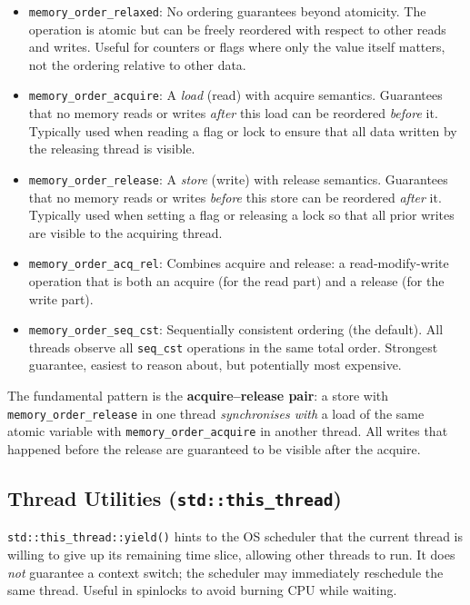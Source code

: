 \documentclass{article}
\begin{document}
\begin{itemize}
    \item \texttt{memory\_order\_relaxed}: No ordering guarantees beyond atomicity. The operation is atomic but can be freely reordered with respect to other reads and writes. Useful for counters or flags where only the value itself matters, not the ordering relative to other data.
    \item \texttt{memory\_order\_acquire}: A \emph{load} (read) with acquire semantics. Guarantees that no memory reads or writes \emph{after} this load can be reordered \emph{before} it. Typically used when reading a flag or lock to ensure that all data written by the releasing thread is visible.
    \item \texttt{memory\_order\_release}: A \emph{store} (write) with release semantics. Guarantees that no memory reads or writes \emph{before} this store can be reordered \emph{after} it. Typically used when setting a flag or releasing a lock so that all prior writes are visible to the acquiring thread.
    \item \texttt{memory\_order\_acq\_rel}: Combines acquire and release: a read-modify-write operation that is both an acquire (for the read part) and a release (for the write part).
    \item \texttt{memory\_order\_seq\_cst}: Sequentially consistent ordering (the default). All threads observe all \texttt{seq\_cst} operations in the same total order. Strongest guarantee, easiest to reason about, but potentially most expensive.
\end{itemize}

The fundamental pattern is the \textbf{acquire--release pair}: a store with \texttt{memory\_order\_release} in one thread \emph{synchronises with} a load of the same atomic variable with \texttt{memory\_order\_acquire} in another thread. All writes that happened before the release are guaranteed to be visible after the acquire.

\subsection{Thread Utilities (\texttt{std::this\_thread})}
\texttt{std::this\_thread::yield()} hints to the OS scheduler that the current thread is willing to give up its remaining time slice, allowing other threads to run. It does \emph{not} guarantee a context switch; the scheduler may immediately reschedule the same thread. Useful in spinlocks to avoid burning CPU while waiting.
\end{document}
